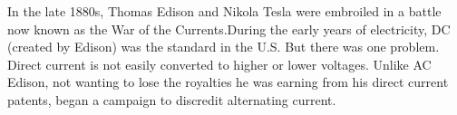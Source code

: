 \documentclass[preview]{standalone}
\begin{document}
\centering In the late 1880s, Thomas Edison and Nikola Tesla were embroiled in a battle now known as the War of the Currents.\newline During the early years of electricity, DC (created by Edison) was the standard in the U.S. But there was one problem. Direct current is not easily converted to higher or lower voltages. Unlike AC Edison, not wanting to lose the royalties he was earning from his direct current patents, began a campaign to discredit alternating current.
\end{document}
